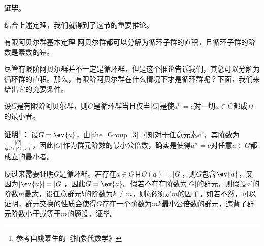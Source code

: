 \textbf{证毕}。















结合上述定理，我们就得到了这节的重要推论。

\begin{corollary}{有限阿贝尔群基本定理}
阿贝尔群都可以分解为循环子群的直积，且循环子群的阶数是素数的幂。
\end{corollary}
尽管有限阶阿贝尔群并不一定是循环群，但是这个推论告诉我们，其总可以分解为循环群的直积。那么，有限阶阿贝尔群在什么情况下才是循环群呢？下面，我们来给出它的充要条件。
\begin{theorem}{}\label{the_cyclic_5}
设$G$是有限阶阿贝尔群，则$G$是循环群当且仅当$|G|$是使$a^n=e$对一切$a\in G$都成立的最小者。
\end{theorem}

\textbf{证明\footnote{参考自姚慕生的《抽象代数学》}：}
设$G=\ev{a}$，由\autoref{the_Group_3} 可知对于任意元素$a^r$，其阶数为$\frac{|G|}{gcd(|G|,r)}$，因此$|G|$作为群元阶数的最小公倍数，确实是使得$a^n=e$对任意$a\in G$都成立的最小者。

反过来需要证明$G$是循环群。若存在$a\in G$且$O(a)=|G|$，则$G$包含$\ev{a}$，又因为$|\ev{a}|=|G|$，因此$G=\ev{a}$。假若不存在阶数为$|G|$的群元，则假设$a'$的阶数$m$最大，设任意群元$b$的阶数为$k\neq m$，则$k$必须是$m$的因子。如若不然，可以证明，群元交换的性质会使得$G$存在一个阶数为$mk$最小公倍数的群元，违背了群元阶数小于或等于$m$的题设，证毕。

